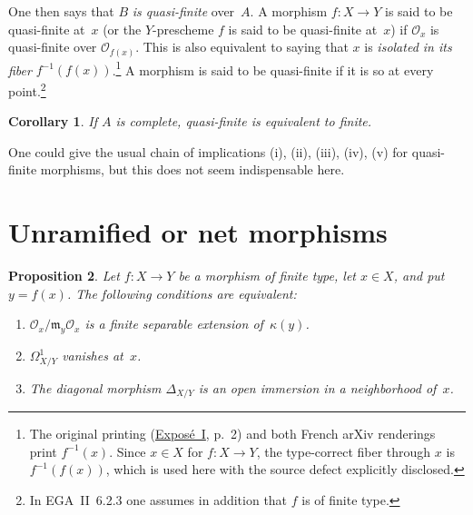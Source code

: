 \documentclass[11pt,oneside]{amsbook}
\newtheorem{proposition}{Proposition}[section]
\newtheorem{corollary}[proposition]{Corollary}
\theoremstyle{remark}
\theoremstyle{plain}
\numberwithin{equation}{section}
\begin{document}
One then says that
\(B\) \emph{is quasi-finite} over~\(A\).  A morphism
\(f\colon X\to Y\) is said to be quasi-finite at~\(x\) (or the
\(Y\)-prescheme \(f\) is said to be quasi-finite at~\(x\)) if
\(\mathcal O_x\) is quasi-finite over \(\mathcal O_{f(x)}\).  This is also
equivalent to saying that \(x\) is \emph{isolated in its fiber}
\(f^{-1}(f(x))\).\footnote{The original printing
(\hyperref[I]{Exposé~I}, p.~2) and both
French arXiv renderings print \(f^{-1}(x)\).  Since \(x\in X\) for
\(f\colon X\to Y\), the type-correct fiber through \(x\) is
\(f^{-1}(f(x))\), which is used here with the source defect explicitly
disclosed.} A morphism is said to be quasi-finite if it is so at
every point.\footnote{In EGA~II~6.2.3 one assumes in addition that \(f\) is
of finite type.}

\begin{corollary}
\label{I.2.2}
If \(A\) is complete, quasi-finite is equivalent to finite.
\end{corollary}

One could give the usual chain of implications \textup{(i), (ii), (iii),
(iv), (v)} for quasi-finite morphisms, but this does not seem indispensable
here.


\section{Unramified or net morphisms}
\label{I.3}

\begin{proposition}
\label{I.3.1}
Let \(f\colon X\to Y\) be a morphism of finite type, let \(x\in X\), and
put \(y=f(x)\).  The following conditions are equivalent:
\begin{enumerate}
\item[(i)] 
  \(\mathcal O_x/\mathfrak m_y\mathcal O_x\) is a finite separable
  extension of~\(\kappa(y)\).
\item[(ii)] \(\Omega^1_{X/Y}\) vanishes at~\(x\).
\item[(iii)] The diagonal morphism \(\Delta_{X/Y}\) is an open immersion
  in a neighborhood of~\(x\).
\end{enumerate}
\end{proposition}
\end{document}
